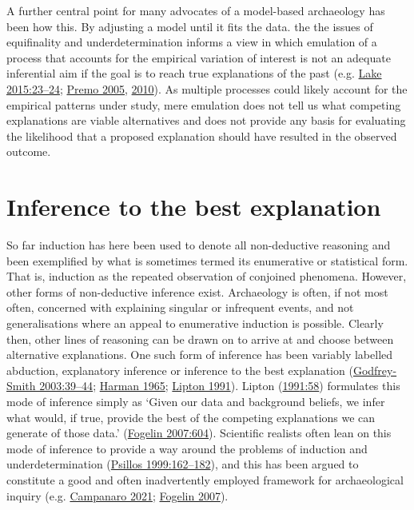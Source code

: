 \documentclass[
  12pt,
  a4paper,
  oneside]{book}
\begin{document}
A further central point for many advocates of a model-based archaeology has been how this. By adjusting a model until it fits the data. the the issues of equifinality and underdetermination informs a view in which emulation of a process that accounts for the empirical variation of interest is not an adequate inferential aim if the goal is to reach true explanations of the past (e.g. \protect\hyperlink{ref-lake2015}{Lake 2015:23--24}; \protect\hyperlink{ref-premo2005}{Premo 2005}, \protect\hyperlink{ref-premo2010}{2010}). As multiple processes could likely account for the empirical patterns under study, mere emulation does not tell us what competing explanations are viable alternatives and does not provide any basis for evaluating the likelihood that a proposed explanation should have resulted in the observed outcome.

\hypertarget{inference-to-the-best-explanation}{%
\section{Inference to the best explanation}\label{inference-to-the-best-explanation}}

So far induction has here been used to denote all non-deductive reasoning and been exemplified by what is sometimes termed its enumerative or statistical form. That is, induction as the repeated observation of conjoined phenomena. However, other forms of non-deductive inference exist. Archaeology is often, if not most often, concerned with explaining singular or infrequent events, and not generalisations where an appeal to enumerative induction is possible. Clearly then, other lines of reasoning can be drawn on to arrive at and choose between alternative explanations. One such form of inference has been variably labelled abduction, explanatory inference or inference to the best explanation (\protect\hyperlink{ref-godfrey-smith2003}{Godfrey-Smith 2003:39--44}; \protect\hyperlink{ref-harman1965}{Harman 1965}; \protect\hyperlink{ref-lipton1991}{Lipton 1991}). Lipton (\protect\hyperlink{ref-lipton1991}{1991:58}) formulates this mode of inference simply as `Given our data and background beliefs, we infer what would, if true, provide the best of the competing explanations we can generate of those data.' (\protect\hyperlink{ref-fogelin2007}{Fogelin 2007:604}). Scientific realists often lean on this mode of inference to provide a way around the problems of induction and underdetermination (\protect\hyperlink{ref-psillos1999}{Psillos 1999:162--182}), and this has been argued to constitute a good and often inadvertently employed framework for archaeological inquiry (e.g. \protect\hyperlink{ref-campanaro2021}{Campanaro 2021}; \protect\hyperlink{ref-fogelin2007}{Fogelin 2007}).
\end{document}
